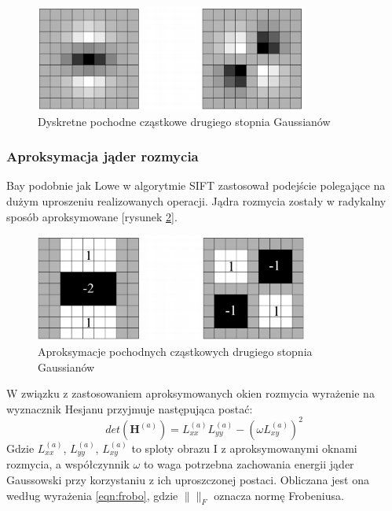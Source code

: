 \begin{figure}[!htb]
\centering
\includegraphics[width=0.8\textwidth]{pict/02/surf/surf_bay_gaussian_discretization.png}
\caption{Dyskretne pochodne cząstkowe drugiego stopnia Gaussianów}
\label{fig:surf_bay_gaussian_discretization}
\end{figure}
\subsubsection{Aproksymacja jąder rozmycia}
Bay podobnie jak Lowe w algorytmie SIFT zastosował podejście polegające na dużym uproszeniu realizowanych operacji. Jądra rozmycia zostały w radykalny sposób aproksymowane [rysunek \ref{fig:surf_bay_gaussian_approximation}].

\begin{figure}[!htb]
\centering
\includegraphics[width=0.8\textwidth]{pict/02/surf/surf_bay_gaussian_approximation.png}
\caption{Aproksymacje pochodnych cząstkowych drugiego stopnia Gaussianów}
\label{fig:surf_bay_gaussian_approximation}
\end{figure}

W związku z zastosowaniem aproksymowanych okien rozmycia wyrażenie na wyznacznik Hesjanu przyjmuje następująca postać:
\begin{equation}
det(\textbf{H}^{(a)}) = L_{xx}^{(a)} L_{yy}^{(a)}-(\omega L_{xy}^{(a)})^2
\label{eqn:det_aprox}
\end{equation}
Gdzie $L_{xx}^{(a)}$, $L_{yy}^{(a)}$, $L_{xy}^{(a)}$ to sploty obrazu I z aproksymowanymi oknami rozmycia, a współczynnik $\omega$ to waga potrzebna zachowania energii jąder Gaussowski przy korzystaniu z ich uproszczonej postaci. Obliczana jest ona według wyrażenia \ref{eqn:frobo}, gdzie $\|\|_F$ oznacza normę Frobeniusa.


